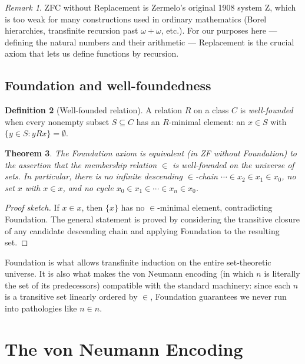 \documentclass[12pt]{article}
\newtheorem{theorem}{Theorem}[section]
\theoremstyle{definition}
\newtheorem{definition}[theorem]{Definition}
\theoremstyle{remark}
\newtheorem{remark}[theorem]{Remark}
\begin{document}
\begin{remark}
ZFC without Replacement is Zermelo's original 1908 system $\mathrm{Z}$, which
is too weak for many constructions used in ordinary mathematics (Borel
hierarchies, transfinite recursion past $\omega + \omega$, etc.). For our
purposes here --- defining the natural numbers and their arithmetic ---
Replacement is the crucial axiom that lets us define functions by recursion.
\end{remark}

\subsection{Foundation and well-foundedness}

\begin{definition}[Well-founded relation]
A relation $R$ on a class $C$ is \emph{well-founded} when every nonempty
subset $S \subseteq C$ has an $R$-minimal element: an $x \in S$ with
$\{y \in S : yRx\} = \emptyset$.
\end{definition}

\begin{theorem}\label{thm:found}
The Foundation axiom is equivalent (in ZF without Foundation) to the
assertion that the membership relation $\in$ is well-founded on the universe
of sets. In particular, there is no infinite descending $\in$-chain
$\cdots \in x_2 \in x_1 \in x_0$, no set $x$ with $x \in x$, and no cycle
$x_0 \in x_1 \in \cdots \in x_n \in x_0$.
\end{theorem}

\begin{proof}[Proof sketch]
If $x \in x$, then $\{x\}$ has no $\in$-minimal element, contradicting
Foundation. The general statement is proved by considering the transitive
closure of any candidate descending chain and applying Foundation to the
resulting set.
\end{proof}

Foundation is what allows transfinite induction on the entire set-theoretic
universe. It is also what makes the von Neumann encoding (in which $n$ is
literally the set of its predecessors) compatible with the standard
machinery: since each $n$ is a transitive set linearly ordered by $\in$,
Foundation guarantees we never run into pathologies like $n \in n$.

\section{The von Neumann Encoding}
\label{sec:vN}
\end{document}
